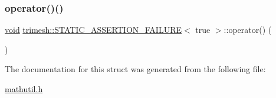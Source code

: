\subsubsection{\texorpdfstring{operator()()}{operator()()}}
{\footnotesize\ttfamily \hyperlink{namespacetrimesh_a784ddfd979e1c579bda795a8edfc3f43}{void} \hyperlink{structtrimesh_1_1STATIC__ASSERTION__FAILURE}{trimesh\+::\+S\+T\+A\+T\+I\+C\+\_\+\+A\+S\+S\+E\+R\+T\+I\+O\+N\+\_\+\+F\+A\+I\+L\+U\+RE}$<$ true $>$\+::operator() (\begin{DoxyParamCaption}{ }\end{DoxyParamCaption})\hspace{0.3cm}{\ttfamily [inline]}}



The documentation for this struct was generated from the following file\+:\begin{DoxyCompactItemize}
\item 
\hyperlink{mathutil_8h}{mathutil.\+h}\end{DoxyCompactItemize}
